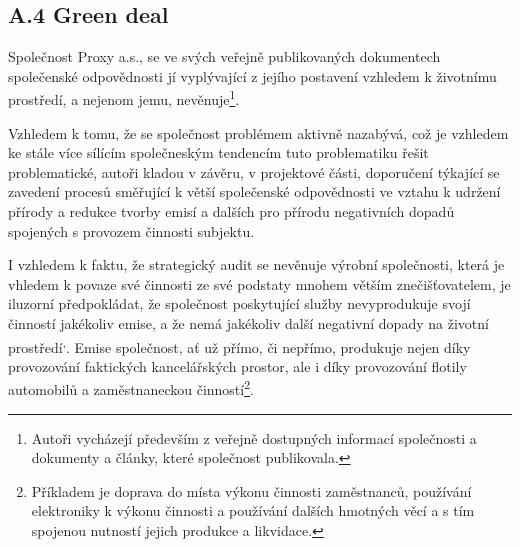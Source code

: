 \subsection*{A.4 Green deal}
\label{sec:Green deal}

Společnost Proxy a.s., se ve svých veřejně publikovaných dokumentech společenské odpovědnosti jí vyplývající z jejího postavení vzhledem k životnímu prostředí, a nejenom jemu, nevěnuje\footnote{Autoři vycházejí především z veřejně dostupných informací společnosti a dokumenty a články, které společnost publikovala.}.\\


\vspace*{-1mm}

Vzhledem k tomu, že se společnost problémem aktivně nazabývá, což je vzhledem ke stále více sílícím společneským tendencím tuto problematiku řešit problematické, autoři kladou v závěru, v projektové části, doporučení týkající se zavedení procesů směřující k větší společenské odpovědnosti ve vztahu k udržení přírody a redukce tvorby emisí a dalších pro přírodu negativních dopadů spojených s provozem činnosti subjektu.\\

\vspace*{-1mm}

I vzhledem k faktu, že strategický audit se nevěnuje výrobní společnosti, která je vhledem k povaze své činnosti ze své podstaty mnohem větším znečišťovatelem, je iluzorní předpokládat, že společnost poskytující služby nevyprodukuje svojí činností jakékoliv emise, a že nemá jakékoliv další negativní dopady na životní prostředí\textsuperscript{,}. Emise společnost, ať už přímo, či nepřímo, produkuje nejen díky provozování faktických kancelářských prostor, ale i díky provozování flotily automobilů a zaměstnaneckou činností\footnote{Příkladem je doprava do místa výkonu činnosti zaměstnanců, používání elektroniky k výkonu činnosti a používání dalších hmotných věcí a s tím spojenou nutností jejich produkce a likvidace.}. 




